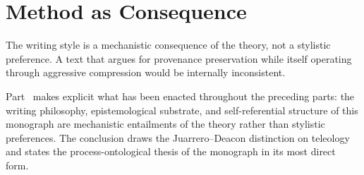 \part{Method as Consequence}
\label{part:method}

\epigraph{The writing style is a mechanistic consequence of the theory, not a
stylistic preference. A text that argues for provenance preservation while itself
operating through aggressive compression would be internally inconsistent.}{}

\noindent Part~\ref{part:method} makes explicit what has been enacted throughout the
preceding parts: the writing philosophy, epistemological substrate, and self-referential
structure of this monograph are mechanistic entailments of the theory rather than
stylistic preferences. The conclusion draws the Juarrero--Deacon distinction on
teleology and states the process-ontological thesis of the monograph in its most
direct form.
\cleardoublepage
